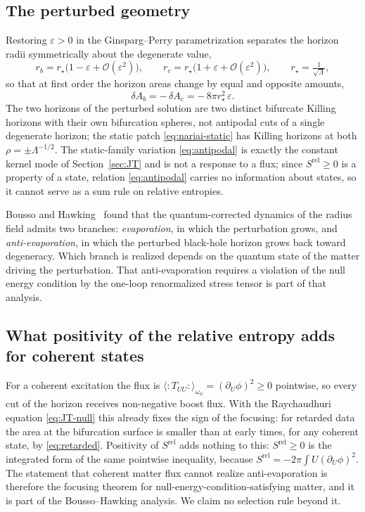\documentclass[11pt]{article}
\newcommand{\Srel}{S^{\mathrm{rel}}}
\begin{document}
\subsection{The perturbed geometry}

Restoring $\varepsilon > 0$ in the Ginsparg--Perry parametrization separates the horizon radii symmetrically about the degenerate value,
\begin{equation}
r_b = r_\star\big(1 - \varepsilon + \mathcal{O}(\varepsilon^2)\big),
\qquad
r_c = r_\star\big(1 + \varepsilon + \mathcal{O}(\varepsilon^2)\big),
\qquad r_\star = \tfrac{1}{\sqrt{\Lambda}},
\label{eq:split}
\end{equation}
so that at first order the horizon areas change by equal and opposite amounts,
\begin{equation}
\delta A_b = -\,\delta A_c = -\,8\pi r_\star^2\, \varepsilon .
\label{eq:antipodal}
\end{equation}
The two horizons of the perturbed solution are two distinct bifurcate Killing horizons with their own bifurcation spheres, not antipodal cuts of a single degenerate horizon; the static patch \eqref{eq:nariai-static} has Killing horizons at both $\rho=\pm\Lambda^{-1/2}$. The static-family variation \eqref{eq:antipodal} is exactly the constant kernel mode of Section~\ref{sec:JT} and is not a response to a flux; since $\Srel\ge0$ is a property of a state, relation \eqref{eq:antipodal} carries no information about states, so it cannot serve as a sum rule on relative entropies.

Bousso and Hawking~\cite{BoussoHawking} found that the quantum-corrected dynamics of the radius field admits two branches: \emph{evaporation}, in which the perturbation grows, and \emph{anti-evaporation}, in which the perturbed black-hole horizon grows back toward degeneracy. Which branch is realized depends on the quantum state of the matter driving the perturbation. That anti-evaporation requires a violation of the null energy condition by the one-loop renormalized stress tensor is part of that analysis.

\subsection{What positivity of the relative entropy adds for coherent states}

For a coherent excitation the flux is $\langle{:}T_{UU}{:}\rangle_{\omega_\phi}=(\partial_U\phi)^2\ge0$ pointwise, so every cut of the horizon receives non-negative boost flux. With the Raychaudhuri equation \eqref{eq:JT-null} this already fixes the sign of the focusing: for retarded data the area at the bifurcation surface is smaller than at early times, for any coherent state, by \eqref{eq:retarded}. Positivity of $\Srel$ adds nothing to this: $\Srel\ge0$ is the integrated form of the same pointwise inequality, because $\Srel=-2\pi\int U(\partial_U\phi)^2$. The statement that coherent matter flux cannot realize anti-evaporation is therefore the focusing theorem for null-energy-condition-satisfying matter, and it is part of the Bousso--Hawking analysis. We claim no selection rule beyond it.
\end{document}
